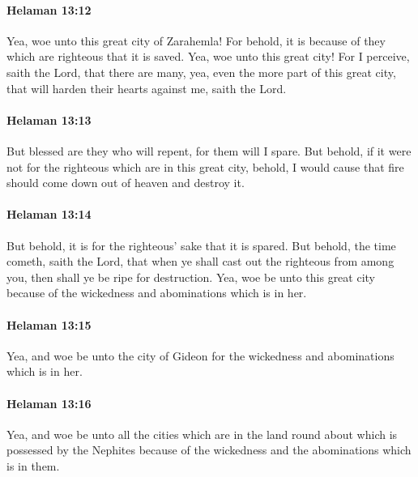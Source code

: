 		\paragraph{Helaman 13:12} %
			\label{HELAMAN-13-12}

			Yea, woe unto this great city of Zarahemla!
			For behold, it is because of they which are righteous that it is saved.
			Yea, woe unto this great city!
			For I perceive, saith the Lord, that there are many,
			yea, even the more part of this great city,
			that will harden their hearts against me, saith the Lord.

		\paragraph{Helaman 13:13} %
			\label{HELAMAN-13-13}

			But blessed are they who will repent,
			for them will I spare.
			But behold, if it were not for the righteous which are in this great city,
			behold, I would cause that fire should come down out of heaven and destroy it.

		\paragraph{Helaman 13:14} %
			\label{HELAMAN-13-14}

			But behold, it is for the righteous' sake that it is spared.
			But behold, the time cometh, saith the Lord,
			that when ye shall cast out the righteous from among you,
			then shall ye be ripe for destruction.
			Yea, woe be unto this great city
			because of the wickedness and abominations which is in her.

		\paragraph{Helaman 13:15} %
			\label{HELAMAN-13-15}

			Yea, and woe be unto the city of Gideon
			for the wickedness and abominations which is in her.

		\paragraph{Helaman 13:16} %
			\label{HELAMAN-13-16}

			Yea, and woe be unto all the cities
			which are in the land round about which is possessed by the Nephites
			because of the wickedness and the abominations which is in them.

